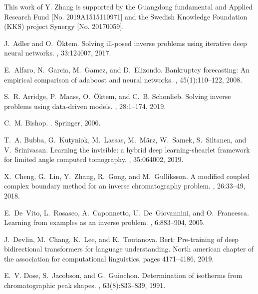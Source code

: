 \documentclass[thmsa,onecolumn,12pt]{article}%
\begin{document}
This work of Y. Zhang is supported by the Guangdong fundamental and Applied Research Fund [No. 2019A1515110971] and the Swedish Knowledge Foundation (KKS) project Synergy [No. 20170059].


\begin{thebibliography}{99}

J.~Adler and O.~\"Oktem.
\newblock Solving ill-posed inverse problems using iterative deep neural
  networks.
, 33:124007, 2017.

E.~Alfaro, N.~Garcia, M.~Gamez, and D.~Elizondo.
\newblock Bankruptcy forecasting: An empirical comparison of adaboost and
  neural networks.
, 45(1):110--122, 2008.

S.~R. Arridge, P.~Maass, O.~\"Oktem, and C.~B. Schonlieb.
\newblock Solving inverse problems using data-driven models.
, 28:1--174, 2019.

C.~M. Bishop.
.
\newblock Springer, 2006.

T.~A. Bubba, G.~Kutyniok, M.~Lassas, M.~M\"arz, W.~Samek, S.~Siltanen, and
  V.~Srinivasan.
\newblock Learning the invisible: a hybrid deep learning-shearlet framework for
  limited angle computed tomography.
, 35:064002, 2019.

X.~Cheng, G.~Lin, Y.~Zhang, R.~Gong, and M.~Gulliksson.
\newblock A modified coupled complex boundary method for an inverse
  chromatography problem.
, 26:33--49, 2018.

E.~De~Vito, L.~Rosasco, A.~Caponnetto, U.~De~Giovannini, and O.~Francesca.
\newblock Learning from examples as an inverse problem.
, 6:883--904, 2005.

J.~Devlin, M.~Chang, K.~Lee, and K.~Toutanova.
\newblock Bert: Pre-training of deep bidirectional transformers for language
  understanding.
\newblock North american chapter of the association for computational
  linguistics, pages 4171--4186, 2019.

E.~V. Dose, S.~Jacobson, and G.~Guiochon.
\newblock Determination of isotherms from chromatographic peak shapes.
, 63(8):833--839, 1991.


\end{thebibliography}
\end{document}
